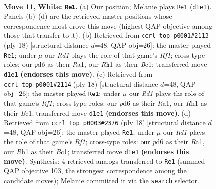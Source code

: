 \documentclass[11pt]{article}
\begin{document}
\begin{figure}[p]
\label{fig:thought-m18}
\end{figure}

\clearpage

\begin{figure}[p]\centering
\begin{subfigure}{0.46\textwidth}\centering
\resizebox{\linewidth}{!}{%
\newchessgame
\chessboard[
  setfen={r2qk2r/pp1bppbp/n2p1np1/8/3NP3/2N1BP2/PPP2QPP/2KR1B1R w kq - 7 11},
  showmover=false,
  pgfstyle=straightmove, color=movearrow, markmove={d1-e1}
]}
\caption{}
\end{subfigure}\hfill
\begin{subfigure}{0.46\textwidth}\centering
\resizebox{\linewidth}{!}{%
\newchessgame
\chessboard[
  setfen={r1bq1rk1/pp3pbp/n2p1np1/2pP4/8/2N2NP1/PPP2PBP/R1BQ1RK1 w - - 1 10},
  showmover=false,
  pgfstyle=straightmove, color=movearrow, markmove={f1-e1}
]}
\caption{}
\end{subfigure}
\\[4pt]
\begin{subfigure}{0.46\textwidth}\centering
\resizebox{\linewidth}{!}{%
\newchessgame
\chessboard[
  setfen={r1bq1rk1/pp3pbp/n2p1np1/2pP4/8/2N2NP1/PPP2PBP/R1BQ1RK1 w - - 1 10},
  showmover=false,
  pgfstyle=straightmove, color=movearrow, markmove={f1-e1}
]}
\caption{}
\end{subfigure}\hfill
\begin{subfigure}{0.46\textwidth}\centering
\resizebox{\linewidth}{!}{%
\newchessgame
\chessboard[
  setfen={r1bq1rk1/pp3pbp/n2p1np1/2pP4/8/2N2NP1/PPP2PBP/R1BQ1RK1 w - - 1 10},
  showmover=false,
  pgfstyle=straightmove, color=movearrow, markmove={f1-e1}
]}
\caption{}
\end{subfigure}
\caption{\textbf{Move 11, White: \texttt{Re1}.} (a) Our position; Melanie plays \texttt{Re1} (\texttt{d1e1}). Panels (b)--(d) are the retrieved master positions whose correspondence most drove this move (highest QAP objective among those that transfer to it). (b) Retrieved from \texttt{ccrl\_top\_p0001\#2113} (ply 18) [structural distance $d$=48, QAP obj=26]: the master played \texttt{Re1}; under $\mu$ our \emph{Rd1} plays the role of that game's \emph{Rf1}; cross-type roles: our \emph{p}d6 as their \emph{R}a1, our \emph{R}h1 as their \emph{B}c1; transferred move \texttt{d1e1} \textbf{(endorses this move)}. (c) Retrieved from \texttt{ccrl\_top\_p0001\#2114} (ply 18) [structural distance $d$=48, QAP obj=26]: the master played \texttt{Re1}; under $\mu$ our \emph{Rd1} plays the role of that game's \emph{Rf1}; cross-type roles: our \emph{p}d6 as their \emph{R}a1, our \emph{R}h1 as their \emph{B}c1; transferred move \texttt{d1e1} \textbf{(endorses this move)}. (d) Retrieved from \texttt{ccrl\_top\_p0003\#2376} (ply 18) [structural distance $d$=48, QAP obj=26]: the master played \texttt{Re1}; under $\mu$ our \emph{Rd1} plays the role of that game's \emph{Rf1}; cross-type roles: our \emph{p}d6 as their \emph{R}a1, our \emph{R}h1 as their \emph{B}c1; transferred move \texttt{d1e1} \textbf{(endorses this move)}. Synthesis: 4 retrieved analogs transferred to \texttt{Re1} (summed QAP objective 103, the strongest correspondence among the candidate moves); Melanie committed it via the \texttt{search} selector.}

\end{figure}
\end{document}
